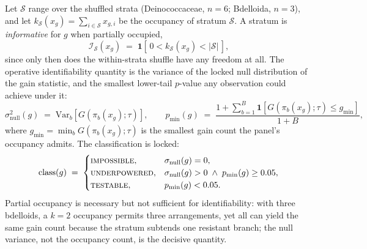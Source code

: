\documentclass[12pt,a4paper]{article}
\begin{document}
Let $\mathcal{S}$ range over the shuffled strata (Deinococcaceae, $n=6$; Bdelloida, $n=3$), and let $k_{\mathcal{S}}(x_g) = \sum_{i \in \mathcal{S}} x_{g,i}$ be the occupancy of stratum $\mathcal{S}$. A stratum is \emph{informative} for $g$ when partially occupied,
\begin{equation}
\mathcal{I}_{\mathcal{S}}(x_g) \;=\; \mathbf{1}\!\left[\, 0 < k_{\mathcal{S}}(x_g) < |\mathcal{S}|\, \right],
\end{equation}
since only then does the within-strata shuffle have any freedom at all. The operative identifiability quantity is the variance of the locked null distribution of the gain statistic, and the smallest lower-tail $p$-value any observation could achieve under it:
\begin{equation}
\sigma^2_{\mathrm{null}}(g) \;=\; \mathrm{Var}_{b}\!\left[ G(\pi_b(x_g);\tau) \right], \qquad
p_{\min}(g) \;=\; \frac{1 + \sum_{b=1}^{B} \mathbf{1}\!\left[ G(\pi_b(x_g);\tau) \le g_{\min} \right]}{1 + B},
\end{equation}
where $g_{\min} = \min_b G(\pi_b(x_g);\tau)$ is the smallest gain count the panel's occupancy admits. The classification is locked:
\begin{equation}
\mathrm{class}(g) \;=\; \begin{cases}
\textsc{impossible}, & \sigma_{\mathrm{null}}(g) = 0,\\
\textsc{underpowered}, & \sigma_{\mathrm{null}}(g) > 0 \;\wedge\; p_{\min}(g) \ge 0.05,\\
\textsc{testable}, & p_{\min}(g) < 0.05.
\end{cases}
\end{equation}
Partial occupancy is necessary but not sufficient for identifiability: with three bdelloids, a $k=2$ occupancy permits three arrangements, yet all can yield the same gain count because the stratum subtends one resistant branch; the null variance, not the occupancy count, is the decisive quantity.
\end{document}
